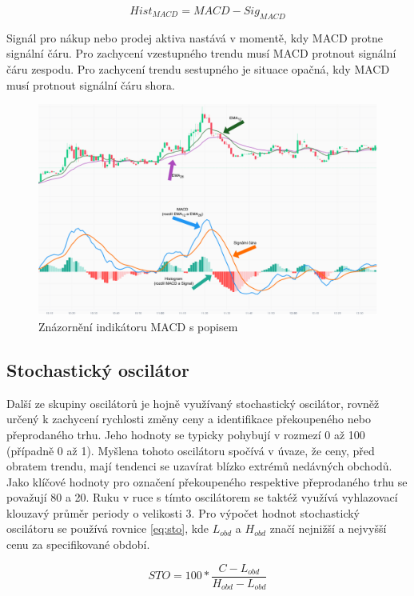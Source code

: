 \begin{equation}
    Hist_{MACD} = MACD - Sig_{MACD}
    \label{eq:macdhist}
\end{equation}

Signál pro nákup nebo prodej aktiva nastává v momentě, kdy MACD protne signální čáru. Pro zachycení vzestupného trendu musí MACD protnout signální čáru zespodu. Pro zachycení
trendu sestupného je situace opačná, kdy MACD musí protnout signální čáru shora. %

\begin{figure}[h]
    \centering
    \includegraphics[width=1\textwidth]{Figures/MACD.pdf}
    \caption{Znázornění indikátoru MACD s popisem}
    \label{fig:macd}
\end{figure}

\subsection{Stochastický oscilátor}
Další ze skupiny oscilátorů je hojně využívaný stochastický oscilátor, rovněž určený k zachycení rychlosti změny ceny a identifikace překoupeného nebo přeprodaného trhu. Jeho
hodnoty se typicky pohybují v rozmezí 0 až 100 (případně 0 až 1). Myšlena tohoto oscilátoru spočívá v úvaze, že ceny, před obratem trendu, mají tendenci se uzavírat blízko extrémů
nedávných obchodů. Jako klíčové hodnoty pro označení překoupeného respektive přeprodaného trhu se považují 80 a 20. Ruku v ruce s tímto oscilátorem se taktéž využívá vyhlazovací
klouzavý průměr periody o velikosti 3. Pro výpočet hodnot stochastický oscilátoru se používá rovnice \ref{eq:sto}, kde $L_{obd}$ a $H_{obd}$ značí nejnižší a nejvyšší cenu za specifikované
období.

\begin{equation}
    STO = 100 * \frac{C  - L_{obd}}{H_{obd} - L_{obd}}
    \label{eq:sto}
\end{equation}


